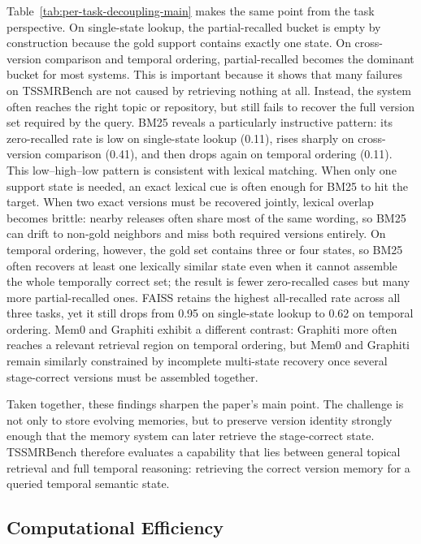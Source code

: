 Table~\ref{tab:per-task-decoupling-main} makes the same point from the task perspective. On single-state lookup, the partial-recalled bucket is empty by construction because the gold support contains exactly one state. On cross-version comparison and temporal ordering, partial-recalled becomes the dominant bucket for most systems. This is important because it shows that many failures on TSSMRBench are not caused by retrieving nothing at all. Instead, the system often reaches the right topic or repository, but still fails to recover the full version set required by the query. BM25 reveals a particularly instructive pattern: its zero-recalled rate is low on single-state lookup (0.11), rises sharply on cross-version comparison (0.41), and then drops again on temporal ordering (0.11). This low--high--low pattern is consistent with lexical matching. When only one support state is needed, an exact lexical cue is often enough for BM25 to hit the target. When two exact versions must be recovered jointly, lexical overlap becomes brittle: nearby releases often share most of the same wording, so BM25 can drift to non-gold neighbors and miss both required versions entirely. On temporal ordering, however, the gold set contains three or four states, so BM25 often recovers at least one lexically similar state even when it cannot assemble the whole temporally correct set; the result is fewer zero-recalled cases but many more partial-recalled ones. FAISS retains the highest all-recalled rate across all three tasks, yet it still drops from 0.95 on single-state lookup to 0.62 on temporal ordering. Mem0 and Graphiti exhibit a different contrast: Graphiti more often reaches a relevant retrieval region on temporal ordering, but Mem0 and Graphiti remain similarly constrained by incomplete multi-state recovery once several stage-correct versions must be assembled together.

Taken together, these findings sharpen the paper's main point. The challenge is not only to store evolving memories, but to preserve version identity strongly enough that the memory system can later retrieve the stage-correct state. TSSMRBench therefore evaluates a capability that lies between general topical retrieval and full temporal reasoning: retrieving the correct version memory for a queried temporal semantic state.

\subsection{Computational Efficiency}

